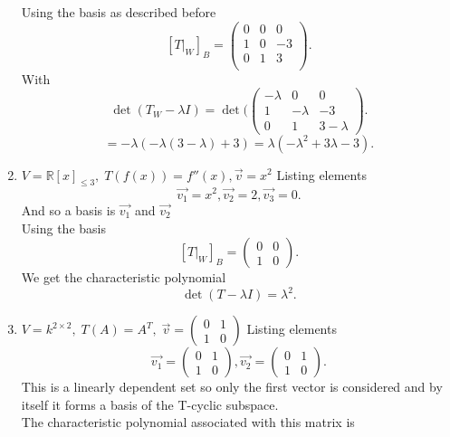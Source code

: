 \documentclass{article}
\begin{document}
\begin{enumerate}
            Using the basis as described before
            \[
                [T|_W]_B = \begin{pmatrix} 0 & 0 & 0\\
                    1 & 0 & -3\\
                    0 & 1 & 3 \\
                \end{pmatrix} 
            .\] 
            With
            \[
            \det(T_W - \lambda I) = 
            \det( \begin{pmatrix} -\lambda & 0 & 0\\
            1 & -\lambda & -3\\
        0 & 1 & 3-\lambda\end{pmatrix} 
            .\] 
            \[
            = -\lambda(-\lambda(3-\lambda) +3) = \lambda(-\lambda^2+3\lambda-3)
            .\] 
        \item $V = \mathbb{R}[x]_{\le 3}, \; T(f(x)) = f''(x), \vec{v} = x^{2}$ 
            Listing elements
            \[
            \vec{v_1} = x^2, \vec{v_2} = 2, \vec{v_3} = 0
            .\] 
            And so a basis is $\vec{v_1}$ and $\vec{v_2}$\\
            Using the basis 
            \[
                [T|_W]_B = \begin{pmatrix} 0 & 0 \\ 1 & 0 \end{pmatrix} 
            .\] 
            We get the characteristic polynomial
            \[
            \det(T-\lambda I) = \lambda^2
            .\] 
        \item $V = k^{2 \times 2}, \; T(A) = A^{T}, \; \vec{v} = \begin{pmatrix} 0 & 1 \\ 1 & 0 \end{pmatrix} $
            Listing elements
            \[
                \vec{v_1} = \begin{pmatrix} 0 & 1 \\ 1 & 0 \end{pmatrix} , \vec{v_2} = \begin{pmatrix} 0 &  1 \\ 1 & 0 \end{pmatrix} 
            .\] 
            This is a linearly dependent set so only the first vector is considered
            and by itself it forms a basis of the T-cyclic subspace.
            \\
            The characteristic polynomial associated with this matrix is

\end{enumerate}
\end{document}
